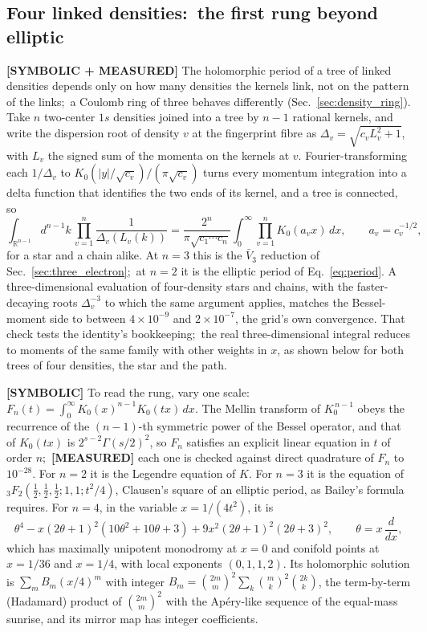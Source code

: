 \documentclass[aps,pra,twocolumn,superscriptaddress,longbibliography]{revtex4-2}
\begin{document}
\subsection{Four linked densities:\ the first rung beyond elliptic}
\label{sec:four_density}

\textbf{[SYMBOLIC + MEASURED]} The holomorphic period of a tree of linked
densities depends only on how many densities the kernels link, not on the
pattern of the links;\ a Coulomb ring of three behaves differently
(Sec.~\ref{sec:density_ring}).  Take $n$ two-center $1s$ densities joined into a tree by $n-1$
rational kernels, and write the dispersion root of density $v$ at the
fingerprint fibre as $\Delta_v=\sqrt{c_vL_v^2+1}$, with $L_v$ the signed
sum of the momenta on the kernels at $v$.  Fourier-transforming each
$1/\Delta_v$ to $K_0(|y|/\sqrt{c_v})/(\pi\sqrt{c_v})$ turns every momentum
integration into a delta function that identifies the two ends of its
kernel, and a tree is connected, so
\begin{equation}
  \int_{\mathbb{R}^{n-1}} d^{n-1}k\,\prod_{v=1}^{n}\frac{1}{\Delta_v(L_v(k))}
  = \frac{2^{n}}{\pi\sqrt{c_1\cdots c_n}}
    \int_0^\infty \prod_{v=1}^{n} K_0(a_v x)\,dx,
  \qquad a_v = c_v^{-1/2},
  \label{eq:tree}
\end{equation}
for a star and a chain alike.  At $n=3$ this is the $\bar V_3$ reduction
of Sec.~\ref{sec:three_electron};\ at $n=2$ it is the elliptic period of
Eq.~\eqref{eq:period}.  A three-dimensional evaluation of four-density
stars and chains, with the faster-decaying roots $\Delta_v^{-3}$ to which
the same argument applies, matches the Bessel-moment side to between
$4\times10^{-9}$ and $2\times10^{-7}$, the grid's own convergence.  That
check tests the identity's bookkeeping;\ the real three-dimensional
integral reduces to moments of the same family with other weights in $x$,
as shown below for both trees of four densities, the star and the path.

\textbf{[SYMBOLIC]} To read the rung, vary one scale:\
$F_n(t)=\int_0^\infty K_0(x)^{n-1}K_0(tx)\,dx$.  The Mellin transform of
$K_0^{\,n-1}$ obeys the recurrence of the $(n-1)$-th symmetric power of the
Bessel operator, and that of $K_0(tx)$ is $2^{s-2}\Gamma(s/2)^2$, so $F_n$
satisfies an explicit linear equation in $t$ of order $n$;\
\textbf{[MEASURED]} each one is checked against direct quadrature of $F_n$
to $10^{-28}$.  For $n=2$ it is the Legendre equation of $K$.  For $n=3$
it is the equation of ${}_3F_2(\tfrac12,\tfrac12,\tfrac12;1,1;t^2/4)$,
Clausen's square of an elliptic period, as Bailey's formula requires.
For $n=4$, in the variable $x=1/(4t^2)$, it is
\begin{equation}
  \theta^4 - x(2\theta+1)^2(10\theta^2+10\theta+3)
  + 9x^2(2\theta+1)^2(2\theta+3)^2,
  \qquad \theta = x\,\frac{d}{dx},
  \label{eq:four_density_op}
\end{equation}
which has maximally unipotent monodromy at $x=0$ and conifold points at
$x=1/36$ and $x=1/4$, with local exponents $(0,1,1,2)$.  Its holomorphic
solution is $\sum_m B_m (x/4)^m$ with integer
$B_m=\binom{2m}{m}^2\sum_k\binom{m}{k}^2\binom{2k}{k}$, the term-by-term
(Hadamard) product of $\binom{2m}{m}^2$ with the Ap\'ery-like sequence of
the equal-mass sunrise, and its mirror map has integer coefficients.
\end{document}
